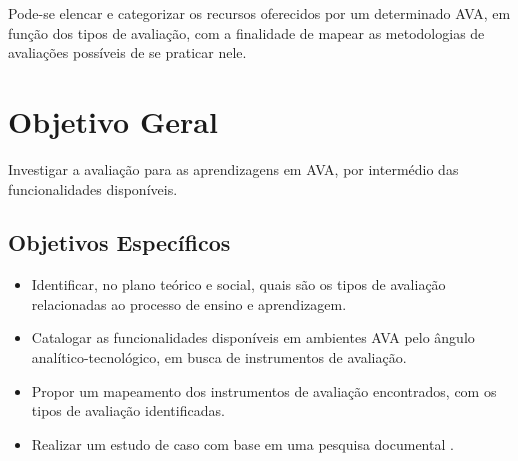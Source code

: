 Pode-se elencar e categorizar os recursos oferecidos por um determinado AVA, em função dos tipos de avaliação, com a finalidade de mapear as metodologias de avaliações possíveis de se praticar nele. 


\section{Objetivo Geral}%

Investigar a avaliação para as aprendizagens em AVA, por intermédio das funcionalidades disponíveis. 



\subsection{Objetivos Específicos}%

\begin{itemize}
	\item Identificar, no plano teórico e social, quais são os tipos de avaliação relacionadas ao processo de ensino e aprendizagem.
	\item Catalogar as funcionalidades disponíveis em ambientes AVA pelo ângulo analítico-tecnológico, em busca de instrumentos de avaliação.
	\item Propor um mapeamento dos instrumentos de avaliação encontrados, com os tipos de avaliação identificadas.
	\item Realizar um estudo de caso com base em uma pesquisa documental . 
\end{itemize}

